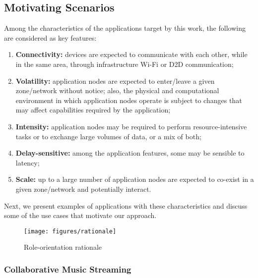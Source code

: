\subsection{Motivating Scenarios}\label{sec:motivating}

Among the characteristics of the applications target by this work, the following are considered as key features:

\begin{enumerate}[label=C\arabic*]
	
	\item \textbf{Connectivity:} devices are expected to communicate with each other, while in the same area, through infrastructure Wi-Fi or D2D communication;
	
	\item \textbf{Volatility:} application nodes are expected to enter/leave a given zone/network without notice; also, the physical and computational environment in which application nodes operate is subject to changes that may affect capabilities required by the application;
	
	\item \textbf{Intensity:} application nodes may be required to perform resource-intensive tasks or to exchange large volumes of data, or a mix of both;
	
	\item \textbf{Delay-sensitive:} among the application features, some may be sensible to latency;
	
	\item \textbf{Scale:} up to a large number of application nodes are expected to co-exist in a given zone/network and potentially interact.

	
\end{enumerate}


Next, we present examples of applications with these characteristics and discuss some of the use cases that motivate our approach.

\begin{figure*}[t!]
	\centering
	\texttt{[image: figures/rationale]}
	\caption{Role-orientation rationale}
	\label{fig:rationale}
\end{figure*}

\subsubsection{Collaborative Music Streaming}

